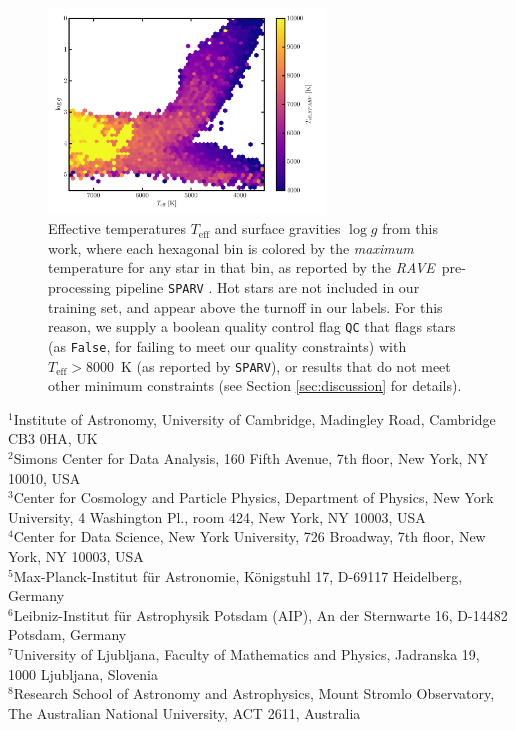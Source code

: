 \documentclass[preprint]{aastex}
\newcommand{\acronym}[1]{{\small{#1}}}
\newcommand{\project}[1]{\textsl{#1}}
\newcommand{\rave}{\project{\acronym{RAVE}}}
\newcommand{\teff}{T_{\mathrm{eff}}}
\newcommand{\logg}{\log g}
\begin{document}
\begin{figure}[p]
\center
\includegraphics[width=0.65\textwidth]{figures/hot-stars.pdf}
\caption{Effective temperatures $\teff$ and surface gravities $\logg$ from this work, where each hexagonal bin is colored by the \emph{maximum} temperature for any star in that bin, as reported by the \rave\ pre-processing pipeline \texttt{SPARV} \citep{Steinmetz_2006,Zwitter_2008}.  Hot stars are not included in our training set, and appear above the turnoff in our labels.  For this reason, we supply a boolean quality control flag \texttt{QC} that flags stars (as \texttt{False}, for failing to meet our quality constraints) with $\teff > 8000$~K (as reported by \texttt{SPARV}), or results that do not meet other minimum constraints (see Section \ref{sec:discussion} for details).\label{fig:hot-stars}}
\end{figure}
 

\clearpage

\noindent{}$^{1}${Institute of Astronomy, University of Cambridge, Madingley Road, Cambridge CB3 0HA, UK} \\
$^{2}${Simons Center for Data Analysis, 160 Fifth Avenue, 7th floor, New York, NY 10010, USA} \\
$^{3}${Center for Cosmology and Particle Physics, Department of Physics, New York University, 4 Washington Pl., room 424, New York, NY 10003, USA} \\
$^{4}${Center for Data Science, New York University, 726 Broadway, 7th floor, New York, NY 10003, USA} \\
$^{5}${Max-Planck-Institut f\"ur Astronomie, K\"onigstuhl 17, D-69117 Heidelberg, Germany} \\
$^{6}$Leibniz-Institut für Astrophysik Potsdam (AIP), An der Sternwarte 16, D-14482 Potsdam, Germany \\
$^{7}${University of Ljubljana, Faculty of Mathematics and Physics, Jadranska 19, 1000 Ljubljana, Slovenia} \\
$^{8}${Research School of Astronomy and Astrophysics, Mount Stromlo Observatory, The Australian National University, ACT 2611, Australia} \\
\end{document}
